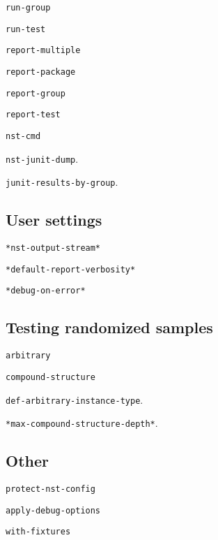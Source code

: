 \texttt{run-group}

\texttt{run-test}
             
\texttt{report-multiple}

\texttt{report-package}

\texttt{report-group}

\texttt{report-test}
             
\texttt{nst-cmd}

\texttt{nst-junit-dump}.

\texttt{junit-results-by-group}.

\subsection{User settings}
\texttt{*nst-output-stream*}

\texttt{*default-report-verbosity*}

\texttt{*debug-on-error*}

\subsection{Testing randomized samples}
\texttt{arbitrary}

\texttt{compound-structure}

\texttt{def-arbitrary-instance-type}.

\texttt{*max-compound-structure-depth*}.

\subsection{Other}
\texttt{protect-nst-config}

\texttt{apply-debug-options}

\texttt{with-fixtures}

